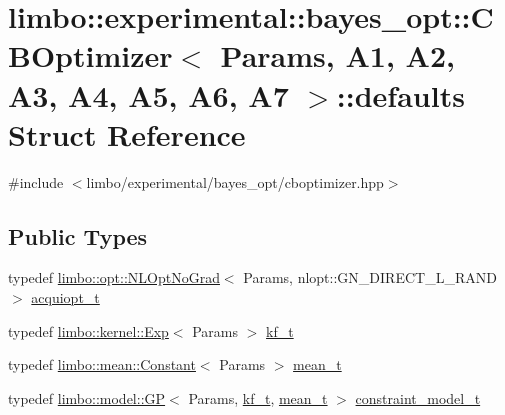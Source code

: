 \hypertarget{structlimbo_1_1experimental_1_1bayes__opt_1_1_c_b_optimizer_1_1defaults}{}\section{limbo\+:\+:experimental\+:\+:bayes\+\_\+opt\+:\+:C\+B\+Optimizer$<$ Params, A1, A2, A3, A4, A5, A6, A7 $>$\+:\+:defaults Struct Reference}
\label{structlimbo_1_1experimental_1_1bayes__opt_1_1_c_b_optimizer_1_1defaults}


{\ttfamily \#include $<$limbo/experimental/bayes\+\_\+opt/cboptimizer.\+hpp$>$}

\subsection*{Public Types}
\begin{DoxyCompactItemize}
\item 
typedef \hyperlink{structlimbo_1_1opt_1_1_n_l_opt_no_grad}{limbo\+::opt\+::\+N\+L\+Opt\+No\+Grad}$<$ Params, nlopt\+::\+G\+N\+\_\+\+D\+I\+R\+E\+C\+T\+\_\+\+L\+\_\+\+R\+A\+N\+D $>$ \hyperlink{structlimbo_1_1experimental_1_1bayes__opt_1_1_c_b_optimizer_1_1defaults_ad87ee1f502b5730ede0b4e46ef9b6437}{acquiopt\+\_\+t}
\item 
typedef \hyperlink{structlimbo_1_1kernel_1_1_exp}{limbo\+::kernel\+::\+Exp}$<$ Params $>$ \hyperlink{structlimbo_1_1experimental_1_1bayes__opt_1_1_c_b_optimizer_1_1defaults_ad111c343608ef57fcb008aba61bd8803}{kf\+\_\+t}
\item 
typedef \hyperlink{structlimbo_1_1mean_1_1_constant}{limbo\+::mean\+::\+Constant}$<$ Params $>$ \hyperlink{structlimbo_1_1experimental_1_1bayes__opt_1_1_c_b_optimizer_1_1defaults_a6f42eec8660a35b4f1eb066af0c1b2b9}{mean\+\_\+t}
\item 
typedef \hyperlink{classlimbo_1_1model_1_1_g_p}{limbo\+::model\+::\+G\+P}$<$ Params, \hyperlink{structlimbo_1_1experimental_1_1bayes__opt_1_1_c_b_optimizer_1_1defaults_ad111c343608ef57fcb008aba61bd8803}{kf\+\_\+t}, \hyperlink{structlimbo_1_1experimental_1_1bayes__opt_1_1_c_b_optimizer_1_1defaults_a6f42eec8660a35b4f1eb066af0c1b2b9}{mean\+\_\+t} $>$ \hyperlink{structlimbo_1_1experimental_1_1bayes__opt_1_1_c_b_optimizer_1_1defaults_afbbb3a7663e1cabe65b094bca5bebc75}{constraint\+\_\+model\+\_\+t}
\end{DoxyCompactItemize}


